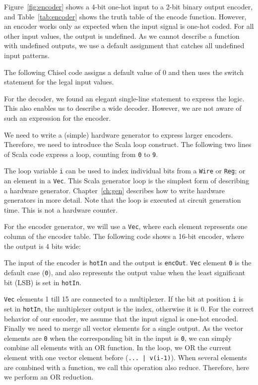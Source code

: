 \documentclass[%
    10pt,
    headinclude, footinclude=false,
    openright, %
    notitlepage,
    cleardoublepage=empty,
    headsepline,
    numbers=noenddot,
    bibliography=totoc, index=totoc,
    ]{scrbook}
\newcommand{\code}[1]{{\lstinline[basicstyle=\small\ttfamily]{#1}}}
\begin{document}
Figure~\ref{fig:encoder} shows a 4-bit one-hot input to a 2-bit binary output encoder, and
Table~\ref{tab:encoder} shows the truth table of the encode function. However, an encoder
works only as expected when the input signal is one-hot coded. For all other input values, the output
is undefined. As we cannot describe a function with undefined outputs, we use a default
assignment that catches all undefined input patterns.

The following Chisel code assigns a default value of 0 and then uses the switch statement
for the legal input values.


For the decoder, we found an elegant single-line statement to express the logic.
This also enables us to describe a wide decoder. However, we are not aware
of such an expression for the encoder.

We need to write a (simple) hardware generator to express larger encoders.
Therefore, we need to introduce the Scala loop construct. The following two lines
of Scala code express a loop, counting from \code{0} to \code{9}.


\noindent The loop variable \code{i} can be used to index individual bits from a \code{Wire} or
\code{Reg}; or an element in a \code{Vec}. This Scala generator loop is the simplest form of describing
a hardware generator. Chapter~\ref{ch:gen} describes how to write hardware generators in more detail.
Note that the loop is executed at circuit generation time. This is not a hardware counter.

For the encoder generator, we will use a \code{Vec}, where each element represents one column
of the encoder table. The following code shows a 16-bit encoder, where the output is 4 bits wide:


\noindent The input of the encoder is \code{hotIn} and the output is \code{encOut}.
\code{Vec} element \code{0} is the default case (\code{0}), and also represents the output
value when the least significant bit (LSB) is set in \code{hotIn}.

\code{Vec} elements 1 till 15 are connected to a multiplexer. If the bit at position \code{i}
is set in \code{hotIn}, the multiplexer output is the index, otherwise it is 0. For the correct
behavior of our encoder, we assume that the input signal is one-hot encoded.
Finally we need to merge all vector elements for a single output. As the vector elements
are \code{0} when the corresponding bit in the input is \code{0}, we can simply combine
all elements with an OR function. In the loop, we OR the current element with one vector
element before (\code{... | v(i-1)}). When several elements are combined with a function,
we call this operation also reduce. Therefore, here we perform an OR reduction.
\end{document}
